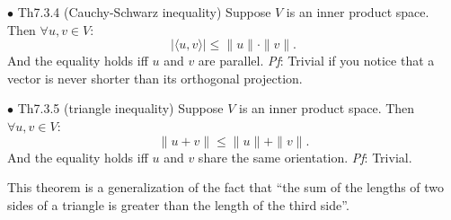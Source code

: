\documentclass{article}
\begin{document}
\begin{Th}{$\bullet$ Th7.3.4 (Cauchy-Schwarz inequality)}
    Suppose $V$ is an inner product space. Then $\forall u, v\in V$: 
    $$|\langle u, v\rangle | \leq \|u\|\cdot \|v\|.$$
    And the equality holds iff $u$ and $v$ are parallel.
    \tcblower
    \textit{Pf}: Trivial if you notice that a vector is never shorter than its orthogonal projection.
\end{Th}

\begin{Th}{$\bullet$ Th7.3.5 (triangle inequality)}
    Suppose $V$ is an inner product space. Then $\forall u, v\in V$:
    $$\|u+v\|\leq \|u\| + \|v\|.$$
    And the equality holds iff $u$ and $v$ share the same orientation.
    \tcblower
    \textit{Pf}: Trivial.
\end{Th}

\begin{Rmk}{}
    This theorem is a generalization of the fact that ``the sum of the lengths of two sides of a triangle is greater than the length of the third side''.
\end{Rmk}
\end{document}
